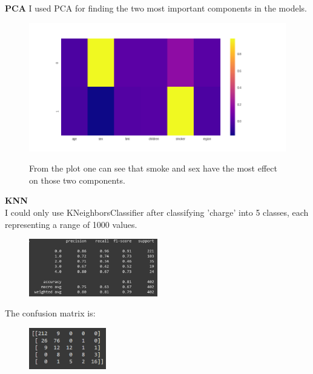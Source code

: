\documentclass[12pt]{article}
\begin{document}
\pagebreak
\textbf{PCA}
I used PCA for finding the two most important components in the models.
\begin{figure}[H]
\centering
\includegraphics[width=\textwidth]{comp_heatmap.png}
\label{mesh:fig1}
\caption{From the plot one can see that smoke and sex have the most effect on those two components.}
\end{figure}
\textbf{KNN}\\
I could only use KNeighborsClassifier after classifying 'charge' into 5 classes, each representing a range of 1000 values. 
\begin{figure}[H]
\centering
\includegraphics[width=0.5\textwidth]{KNN_report.png}
\end{figure}
The confusion matrix is:
\begin{figure}[H]
\centering
\includegraphics[width=0.3\textwidth]{matrics.png}
\end{figure}
\pagebreak
\end{document}
